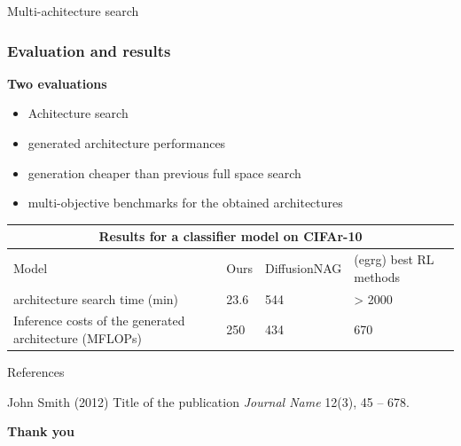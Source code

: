 \documentclass[aspectratio=169,xcolor=dvipsnames]{beamer}
\begin{document}
\begin{frame}{Multi-achitecture search}

    \frametitle{Evaluation and results}
    \textbf{Two evaluations}
    \begin{itemize}
        \item Achitecture search
        \item generated architecture performances
    \end{itemize}

    \begin{itemize}
        \item generation cheaper than previous full space search
        \item multi-objective benchmarks for the obtained architectures
    \end{itemize}


    \begin{tabular}{ |p{3cm}||p{3cm}|p{3cm}|p{3cm}|  }
        \hline
        \multicolumn{4}{|c|}{Results for a classifier model on CIFAr-10}                                      \\
        \hline
        Model                                                  & Ours & DiffusionNAG & (egrg) best RL methods \\
        \hline
        architecture search time (min)                         & 23.6 & 544          & > 2000                 \\
        Inference costs of the generated architecture (MFLOPs) & 250  & 434          & 670                    \\
        \hline
    \end{tabular}

\end{frame}



\begin{frame}{References}
    \footnotesize{
        \begin{thebibliography}{99}
             John Smith (2012)
            \newblock Title of the publication
            \newblock \emph{Journal Name} 12(3), 45 -- 678.
        \end{thebibliography}
    }
\end{frame}


\begin{frame}
    \Huge{\centerline{\textbf{Thank you}}}
\end{frame}

\end{document}
